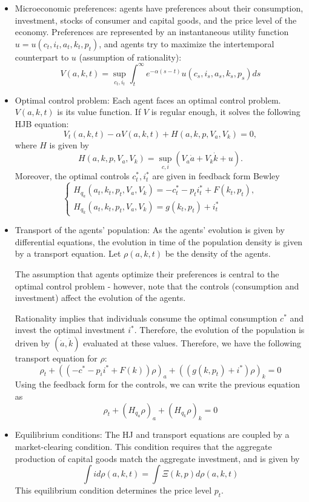 \documentclass{article}
\begin{document}
\begin{itemize}
    \item Microeconomic preferences: agents have preferences about
    their consumption, investment, stocks of consumer and capital goods, and the price level
    of the economy.
    Preferences are represented by an instantaneous utility function
    $u = u(c_t,i_t,a_t,k_t,p_t)$, and agents try to maximize the intertemporal counterpart
    to $u$ (assumption of rationality):
    $$
    V(a,k,t) = \sup_{c_t,i_t} \int_t^\infty e^{-\alpha(s-t)} u(c_s,i_s,a_s,k_s,p_s) ds
    $$
    \item Optimal control problem: 
    Each agent faces an optimal control problem. $V(a,k,t)$ is its value function. 
    If $V$ is regular enough, it solves the following HJB equation:
    $$
    V_t(a,k,t) - \alpha V(a,k,t) + H(a,k,p,V_a,V_k) = 0,
    $$ 
    where $H$ is given by 
    $$
    H(a,k,p,V_a,V_k) = \sup_{c,i}\left( V_a {\dot a }+ V_k {\dot k} + u \right). $$
    Moreover, the optimal controls $c_t^*, i_t^*$ are given in feedback form Bewley
    $$
    \begin{cases}
        H_{q_a} (a_t, k_t, p_t, V_a, V_k) = - c_t^* - p_t i^*_t + F(k_t,p_t),\\
        H_{q_k} (a_t, k_t, p_t, V_a, V_k) = g(k_t, p_t) + i_t^*
    \end{cases}
    $$
    \item Transport of the agents' population:
    As the agents' evolution is given by differential equations, the evolution in time of the
    population density is given by a transport equation. Let $\rho(a,k,t)$ be the density of the agents.

    The assumption that agents optimize their preferences is central to the optimal control problem
    - however, note that the controls (consumption and investment) affect the evolution of the agents.

    Rationality implies that individuals consume the optimal consumption $c^*$ and invest the optimal
    investment $i^*$. Therefore, the evolution of the population is driven by $(\dot a, \dot k)$ evaluated
    at these values. Therefore, we have the following transport equation for $\rho$:
    $$
    \rho_t + ( (- c^* - p_i i^* + F(k)) \rho )_a + ( (g(k,p_t) + i^*) \rho )_k = 0
    $$
    Using the feedback form for the controls, we can write the previous equation as
    $$
    \rho_t + (H_{q_a} \rho)_a + (H_{q_k} \rho)_k = 0
    $$
    \item Equilibrium conditions: The HJ and transport equations are coupled by a market-clearing condition.
    This condition requires that the aggregate production of capital goods match the aggregate investment,
    and is given by
    $$
    \int i d\rho(a,k,t) = \int \Xi(k,p) d\rho(a,k,t)
    $$
    This equilibrium condition determines the price level $p_t$.


\end{itemize}
\end{document}
